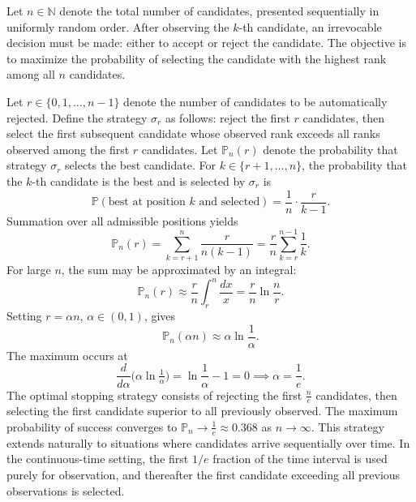 \begin{example}
	Let $n \in \mathbb{N}$ denote the total number of candidates, presented sequentially in uniformly random order. After observing the $k$-th candidate, an irrevocable decision must be made: either to accept or reject the candidate. The objective is to maximize the probability of selecting the candidate with the highest rank among all $n$ candidates.\newline
	
	Let $r \in \{0,1,\dots,n-1\}$ denote the number of candidates to be automatically rejected. Define the strategy $\sigma_r$ as follows: reject the first $r$ candidates, then select the first subsequent candidate whose observed rank exceeds all ranks observed among the first $r$ candidates. Let $\mathbb{P}_n(r)$ denote the probability that strategy $\sigma_r$ selects the best candidate. For $k \in \{r+1,\dots,n\}$, the probability that the $k$-th candidate is the best and is selected by $\sigma_r$ is
	\begin{equation}
		\mathbb{P}(\text{best at position } k \text{ and selected}) = \frac{1}{n} \cdot \frac{r}{k-1}.
	\end{equation}
	Summation over all admissible positions yields
	\begin{equation}
		\mathbb{P}_n(r) = \sum_{k=r+1}^{n} \frac{r}{n(k-1)} = \frac{r}{n} \sum_{k=r}^{n-1} \frac{1}{k}.
	\end{equation}  
	For large $n$, the sum may be approximated by an integral:
	\begin{equation}
		\mathbb{P}_n(r) \approx \frac{r}{n} \int_{r}^{n} \frac{dx}{x} = \frac{r}{n} \ln\frac{n}{r}.
	\end{equation}
	Setting $r = \alpha n$, $\alpha \in (0,1)$, gives
	\begin{equation}
		\mathbb{P}_n(\alpha n) \approx \alpha \ln \frac{1}{\alpha}.
	\end{equation}
	The maximum occurs at
	\begin{equation}
		\frac{d}{d\alpha} \big(\alpha \ln \tfrac{1}{\alpha}\big) = \ln \frac{1}{\alpha} - 1 = 0 \implies \alpha = \frac{1}{e}.
	\end{equation}
	The optimal stopping strategy consists of rejecting the first $\frac{n}{e}$ candidates, then selecting the first candidate superior to all previously observed. The maximum probability of success converges to $\mathbb{P}_n \to \frac{1}{e} \approx 0.368$ as $n \to \infty$. This strategy extends naturally to situations where candidates arrive sequentially over time. In the continuous-time setting, the first $1/e$ fraction of the time interval is used purely for observation, and thereafter the first candidate exceeding all previous observations is selected.
	
\end{example}
